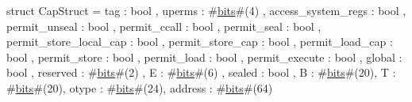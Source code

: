 struct CapStruct = {
  tag                    : bool    ,
  uperms                 : #\hyperref[zbits]{bits}#(4) ,
  access_system_regs     : bool    ,
  permit_unseal          : bool    ,
  permit_ccall           : bool    ,
  permit_seal            : bool    ,
  permit_store_local_cap : bool    ,
  permit_store_cap       : bool    ,
  permit_load_cap        : bool    ,
  permit_store           : bool    ,
  permit_load            : bool    ,
  permit_execute         : bool    ,
  global                 : bool    ,
  reserved               : #\hyperref[zbits]{bits}#(2) ,
  E                      : #\hyperref[zbits]{bits}#(6) ,
  sealed                 : bool    ,
  B                      : #\hyperref[zbits]{bits}#(20),
  T                      : #\hyperref[zbits]{bits}#(20),
  otype                  : #\hyperref[zbits]{bits}#(24),
  address                : #\hyperref[zbits]{bits}#(64)
}
